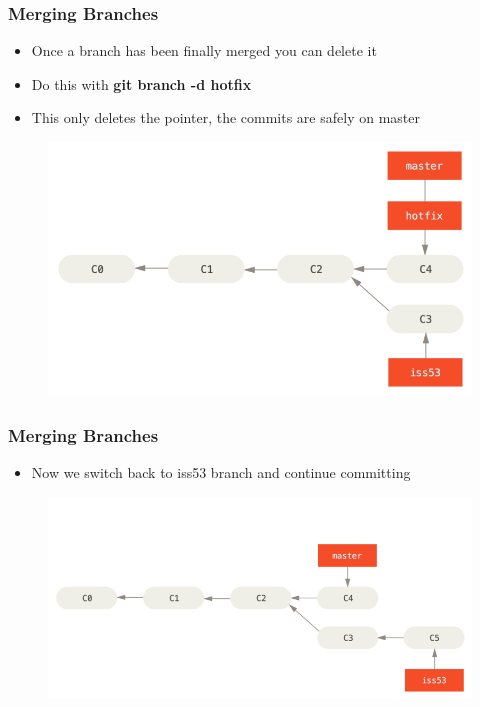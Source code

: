 \documentclass{beamer}
\begin{document}
\begin{frame}
	\frametitle{Merging Branches}
	\begin{itemize}
		\item{Once a branch has been finally merged you can delete it}
		\item{Do this with \textbf{git branch -d hotfix}}
		\item{This only deletes the pointer, the commits are safely on master}
	\end{itemize}
	\begin{figure}
		\includegraphics[scale=0.35]{Merging_Branches-4.png}
	\end{figure}
\end{frame}

\begin{frame}
	\frametitle{Merging Branches}
	\begin{itemize}
		\item{Now we switch back to iss53 branch and continue committing}
	\end{itemize}
	\begin{figure}
		\includegraphics[scale=0.37]{Merging_Branches-5.png}
	\end{figure}
\end{frame}
\end{document}
